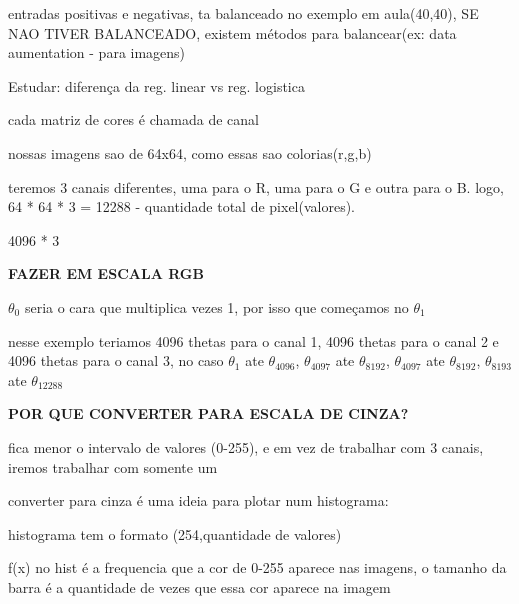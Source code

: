 \documentclass[11pt]{article}
\begin{document}
entradas positivas e negativas, ta balanceado no exemplo em aula(40,40),
SE NAO TIVER BALANCEADO, existem métodos para balancear(ex: data
aumentation - para imagens)

Estudar: diferença da reg. linear vs reg. logistica

cada matriz de cores é chamada de canal

nossas imagens sao de 64x64, como essas sao colorias(r,g,b)

teremos 3 canais diferentes, uma para o R, uma para o G e outra para o
B. logo, 64 * 64 * 3 = 12288 - quantidade total de pixel(valores).

4096 * 3

\textbf{FAZER EM ESCALA RGB}

\(\theta_0\) seria o cara que multiplica vezes 1, por isso que começamos
no \(\theta_1\)

nesse exemplo teriamos 4096 thetas para o canal 1, 4096 thetas para o
canal 2 e 4096 thetas para o canal 3, no caso \(\theta_1\) ate
\(\theta_{4096}\), \(\theta_{4097}\) ate \(\theta_{8192}\),
\(\theta_{4097}\) ate \(\theta_{8192}\), \(\theta_{8193}\) ate
\(\theta_{12288}\)

\textbf{POR QUE CONVERTER PARA ESCALA DE CINZA?}

fica menor o intervalo de valores (0-255), e em vez de trabalhar com 3
canais, iremos trabalhar com somente um

converter para cinza é uma ideia para plotar num histograma:

histograma tem o formato (254,quantidade de valores)

f(x) no hist é a frequencia que a cor de 0-255 aparece nas imagens, o
tamanho da barra é a quantidade de vezes que essa cor aparece na imagem


    
    
    
    
\end{document}
